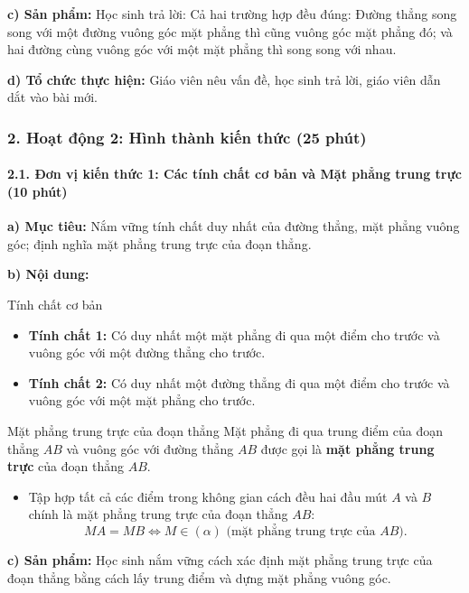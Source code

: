 \documentclass[12pt, a4paper]{article}
\begin{document}
\noindent \textbf{c) Sản phẩm:}
Học sinh trả lời: Cả hai trường hợp đều đúng: Đường thẳng song song với một đường vuông góc mặt phẳng thì cũng vuông góc mặt phẳng đó; và hai đường cùng vuông góc với một mặt phẳng thì song song với nhau.

\noindent \textbf{d) Tổ chức thực hiện:}
Giáo viên nêu vấn đề, học sinh trả lời, giáo viên dẫn dắt vào bài mới.

\subsubsection*{2. Hoạt động 2: Hình thành kiến thức (25 phút)}

\paragraph{2.1. Đơn vị kiến thức 1: Các tính chất cơ bản và Mặt phẳng trung trực (10 phút)}

\noindent \textbf{a) Mục tiêu:}
Nắm vững tính chất duy nhất của đường thẳng, mặt phẳng vuông góc; định nghĩa mặt phẳng trung trực của đoạn thẳng.

\noindent \textbf{b) Nội dung:}
\begin{pedabox}{Tính chất cơ bản}
\begin{itemize}[leftmargin=0.6cm]
    \item \textbf{Tính chất 1:} Có duy nhất một mặt phẳng đi qua một điểm cho trước và vuông góc với một đường thẳng cho trước.
    \item \textbf{Tính chất 2:} Có duy nhất một đường thẳng đi qua một điểm cho trước và vuông góc với một mặt phẳng cho trước.
\end{itemize}
\end{pedabox}

\begin{pedabox}{Mặt phẳng trung trực của đoạn thẳng}
Mặt phẳng đi qua trung điểm của đoạn thẳng $AB$ và vuông góc với đường thẳng $AB$ được gọi là \textbf{mặt phẳng trung trực} của đoạn thẳng $AB$.
\begin{itemize}[leftmargin=0.6cm]
    \item Tập hợp tất cả các điểm trong không gian cách đều hai đầu mút $A$ và $B$ chính là mặt phẳng trung trực của đoạn thẳng $AB$:
    $$M A = M B \iff M \in (\alpha)\text{ (mặt phẳng trung trực của }AB).$$
\end{itemize}
\end{pedabox}

\noindent \textbf{c) Sản phẩm:}
Học sinh nắm vững cách xác định mặt phẳng trung trực của đoạn thẳng bằng cách lấy trung điểm và dựng mặt phẳng vuông góc.
\end{document}
